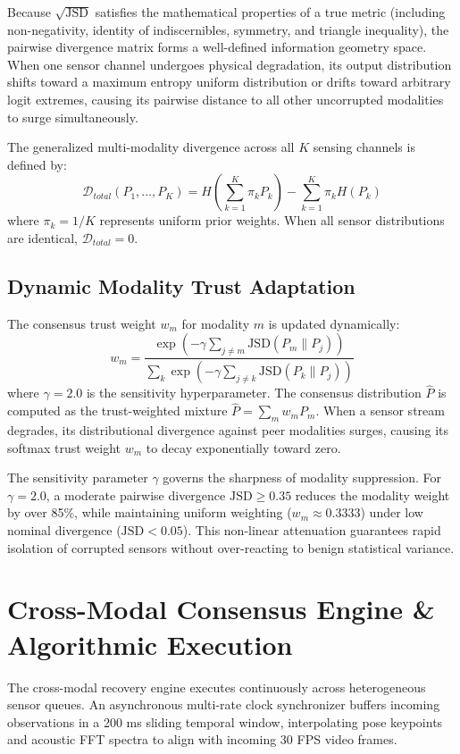\documentclass[conference]{IEEEtran}
\begin{document}
Because $\sqrt{\text{JSD}}$ satisfies the mathematical properties of a true metric (including non-negativity, identity of indiscernibles, symmetry, and triangle inequality), the pairwise divergence matrix forms a well-defined information geometry space. When one sensor channel undergoes physical degradation, its output distribution shifts toward a maximum entropy uniform distribution or drifts toward arbitrary logit extremes, causing its pairwise distance to all other uncorrupted modalities to surge simultaneously.

The generalized multi-modality divergence across all $K$ sensing channels is defined by:
\begin{equation}
\mathcal{D}_{total}(P_1, \dots, P_K) = H\left( \sum_{k=1}^K \pi_k P_k \right) - \sum_{k=1}^K \pi_k H(P_k)
\end{equation}
where $\pi_k = 1/K$ represents uniform prior weights. When all sensor distributions are identical, $\mathcal{D}_{total} = 0$.

\subsection{Dynamic Modality Trust Adaptation}
The consensus trust weight $w_m$ for modality $m$ is updated dynamically:
\begin{equation}
w_m = \frac{\exp\left(-\gamma \sum_{j \neq m} \text{JSD}(P_m \parallel P_j)\right)}{\sum_{k} \exp\left(-\gamma \sum_{j \neq k} \text{JSD}(P_k \parallel P_j)\right)}
\end{equation}
where $\gamma = 2.0$ is the sensitivity hyperparameter. The consensus distribution $\hat{P}$ is computed as the trust-weighted mixture $\hat{P} = \sum_m w_m P_m$. When a sensor stream degrades, its distributional divergence against peer modalities surges, causing its softmax trust weight $w_m$ to decay exponentially toward zero.

The sensitivity parameter $\gamma$ governs the sharpness of modality suppression. For $\gamma = 2.0$, a moderate pairwise divergence $\text{JSD} \ge 0.35$ reduces the modality weight by over 85\%, while maintaining uniform weighting ($w_m \approx 0.3333$) under low nominal divergence ($\text{JSD} < 0.05$). This non-linear attenuation guarantees rapid isolation of corrupted sensors without over-reacting to benign statistical variance.

\section{Cross-Modal Consensus Engine & Algorithmic Execution}
The cross-modal recovery engine executes continuously across heterogeneous sensor queues. An asynchronous multi-rate clock synchronizer buffers incoming observations in a 200 ms sliding temporal window, interpolating pose keypoints and acoustic FFT spectra to align with incoming 30 FPS video frames.
\end{document}
